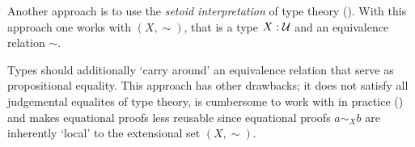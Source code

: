 Another approach is to use the \emph{setoid interpretation} of type theory
(\cite{hofmann-1995,huber-2016}). With this approach one works with
 $(X, \sim)$, that is a type $X \mathrel{:} \mathcal{U}$ and an
equivalence relation $\sim$.

Types should additionally `carry around' an equivalence relation that serve as
propositional equality. This approach has other drawbacks; it does not satisfy
all judgemental equalites of type theory, is cumbersome to work with in practice
(\cite[p. 4]{huber-2016}) and makes equational proofs less reusable since
equational proofs $a \sim_{X} b$ are inherently `local' to the extensional set
$(X , \sim)$.
